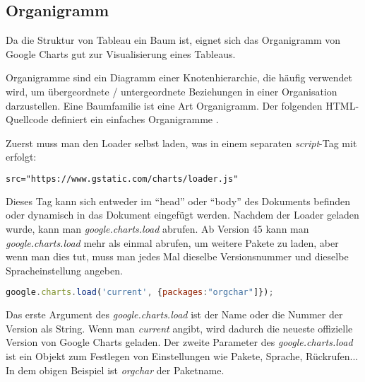 \subsection{Organigramm}\label{Organigramm}
Da die Struktur von Tableau ein Baum ist, eignet sich das Organigramm von Google Charts gut zur Visualisierung eines Tableaus.

Organigramme sind ein Diagramm einer Knotenhierarchie, die häufig verwendet wird, um übergeordnete / untergeordnete Beziehungen in einer Organisation darzustellen. Eine Baumfamilie ist eine Art Organigramm\cite{orgCharts}.
Der folgenden HTML-Quellcode definiert ein einfaches Organigramme \cite{orgCharts}.



Zuerst muss man den Loader selbst laden, was in einem separaten \textit{script}-Tag mit erfolgt: 
\begin{lstlisting}[language=HTML,basicstyle=\scriptsize]
	src="https://www.gstatic.com/charts/loader.js"
\end{lstlisting} 
Dieses Tag kann sich entweder im ``head'' oder ``body'' des Dokuments befinden oder dynamisch in das Dokument eingefügt werden. %
Nachdem der Loader geladen wurde, kann man \textit{google.charts.load} abrufen. 
Ab Version 45 kann man \textit{google.charts.load} mehr als einmal abrufen, um weitere Pakete zu laden, aber wenn man dies tut, muss man jedes Mal dieselbe Versionsnummer und dieselbe Spracheinstellung angeben.\\

\begin{lstlisting}[language=JavaScript,basicstyle=\scriptsize]
google.charts.load('current', {packages:"orgchar"]});
\end{lstlisting}

Das erste Argument des \textit{google.charts.load} ist der Name oder die Nummer der Version als String. 
Wenn man  \textit{current} angibt, wird dadurch die neueste offizielle Version von Google Charts geladen. 
Der zweite Parameter des \textit{google.charts.load} ist ein Objekt zum Festlegen von Einstellungen wie Pakete, Sprache, Rückrufen... In dem obigen Beispiel ist \textit{orgchar} der Paketname.

